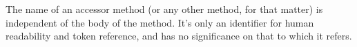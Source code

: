 The name of an accessor method (or any other method, for that matter) is
independent of the body of the method. It's only an identifier for human
readability and token reference, and has no significance on that to
which it refers.
